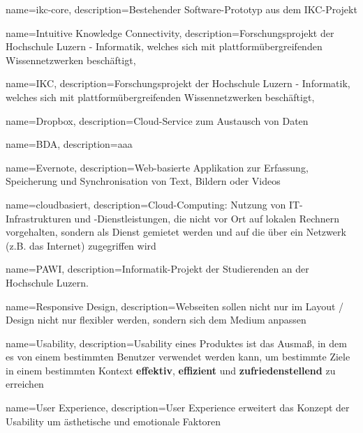 \usepackage[acronym,noredefwarn]{glossaries}
\makenoidxglossaries

{
    name=ikc-core,
    description={Bestehender Software-Prototyp aus dem IKC-Projekt}
}

{
    name=Intuitive Knowledge Connectivity,
    description={Forschungsprojekt der Hochschule Luzern - Informatik, welches sich mit plattformübergreifenden Wissennetzwerken beschäftigt},
}

{
    name=IKC,
    description={Forschungsprojekt der Hochschule Luzern - Informatik, welches sich mit plattformübergreifenden Wissennetzwerken beschäftigt},
}


{
    name=Dropbox,
    description={Cloud-Service zum Austausch von Daten}
    \cite{dropbox}
}

{
    name=BDA,
    description={aaa}
}


{
    name=Evernote,
    description={Web-basierte Applikation zur Erfassung, Speicherung und Synchronisation von Text, Bildern oder Videos}
    \cite{evernote}
}

{
    name=cloudbasiert,
    description={Cloud-Computing: Nutzung von IT-Infrastrukturen und -Dienstleistungen, die nicht vor Ort auf lokalen Rechnern vorgehalten, sondern als Dienst gemietet werden und auf die über ein Netzwerk (z.B. das Internet) zugegriffen wird} \cite{duden.de}
}

{
    name=PAWI,
    description={Informatik-Projekt der Studierenden an der Hochschule Luzern.}
}

{
    name=Responsive Design,
    description={Webseiten sollen nicht nur im Layout / Design nicht nur flexibler werden, sondern sich dem Medium anpassen}
    \cite[S.8]{responsive-webdesign}
}

{
    name=Usability,
    description={Usability eines Produktes ist das Ausmaß, in dem es von einem bestimmten Benutzer verwendet werden kann, um bestimmte Ziele in einem bestimmten Kontext \textbf{effektiv}, \textbf{effizient} und \textbf{zufriedenstellend} zu erreichen}
    \cite{usab}
}

{
    name=User Experience,
    description={User Experience erweitert das Konzept der \gls{Usability} um ästhetische und emotionale Faktoren}
    \cite{ux}
}


